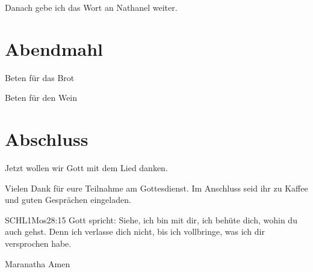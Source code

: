 \documentclass{mybib}
\begin{document}
Danach gebe ich das Wort an Nathanel weiter.



\section{Abendmahl}

Beten für das Brot


Beten für den Wein


\section{Abschluss}

Jetzt wollen wir Gott mit dem Lied  danken.

Vielen Dank für eure Teilnahme am Gottesdienst. Im Anschluss seid ihr zu Kaffee und guten Gesprächen eingeladen.
\beten{}

\begin{bibelbox}{SCHL}{1Mos}{28:15}
Gott spricht: Siehe, ich bin mit dir,
ich behüte dich, wohin du auch gehst.
Denn ich verlasse dich nicht,
bis ich vollbringe, was ich dir versprochen habe.
\end{bibelbox}

Maranatha Amen
\end{document}
